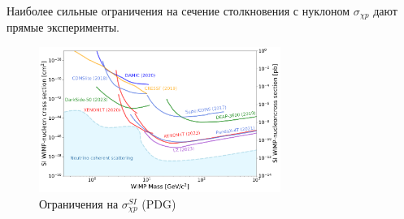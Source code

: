 Наиболее сильные ограничения на сечение столкновения с нуклоном $\sigma_{\chi p}$ дают прямые эксперименты.

\begin{figure}
	\includegraphics[width=0.7\textwidth]{images/pdg_si_limits.pdf}
	\caption{Ограничения на $\sigma^{SI}_{\chi p}$ (PDG)}
\end{figure}
